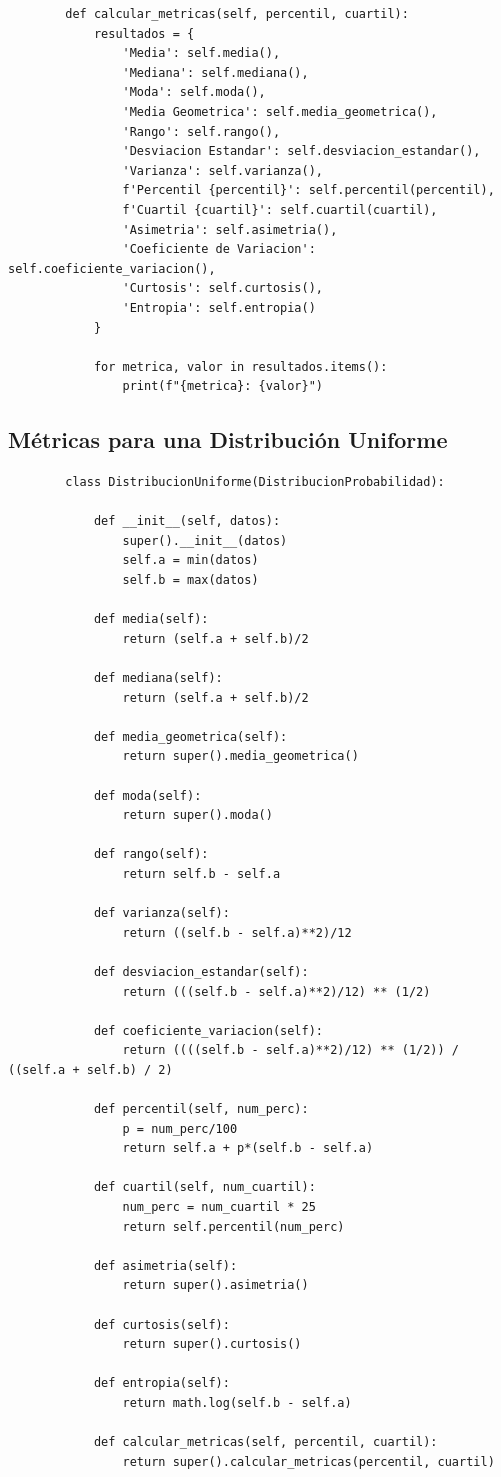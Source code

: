 \documentclass[11pt]{article} %
\begin{document}
\begin{lstlisting}
	 	def calcular_metricas(self, percentil, cuartil):
		 	resultados = {
		 		'Media': self.media(),
		 		'Mediana': self.mediana(),
		 		'Moda': self.moda(),
		 		'Media Geometrica': self.media_geometrica(),
		 		'Rango': self.rango(),
		 		'Desviacion Estandar': self.desviacion_estandar(),
		 		'Varianza': self.varianza(),
		 		f'Percentil {percentil}': self.percentil(percentil),
		 		f'Cuartil {cuartil}': self.cuartil(cuartil),
		 		'Asimetria': self.asimetria(),
		 		'Coeficiente de Variacion': self.coeficiente_variacion(),
		 		'Curtosis': self.curtosis(),
		 		'Entropia': self.entropia()
		 	}
		 	
		 	for metrica, valor in resultados.items():
			 	print(f"{metrica}: {valor}")
	 \end{lstlisting}
	
	\subsection{Métricas para una Distribución Uniforme}
	\begin{lstlisting}
		class DistribucionUniforme(DistribucionProbabilidad):
		
			def __init__(self, datos):
				super().__init__(datos)
				self.a = min(datos)
				self.b = max(datos)
			
			def media(self):
				return (self.a + self.b)/2
			
			def mediana(self):
				return (self.a + self.b)/2
			
			def media_geometrica(self):
				return super().media_geometrica()
			
			def moda(self):
				return super().moda()
			
			def rango(self):
				return self.b - self.a
			
			def varianza(self):
				return ((self.b - self.a)**2)/12
			
			def desviacion_estandar(self):
				return (((self.b - self.a)**2)/12) ** (1/2)
			
			def coeficiente_variacion(self):
				return ((((self.b - self.a)**2)/12) ** (1/2)) / ((self.a + self.b) / 2)
			
			def percentil(self, num_perc):
				p = num_perc/100
				return self.a + p*(self.b - self.a)
			
			def cuartil(self, num_cuartil):
				num_perc = num_cuartil * 25
				return self.percentil(num_perc)
			
			def asimetria(self):
				return super().asimetria()
			
			def curtosis(self):
				return super().curtosis()
			
			def entropia(self):
				return math.log(self.b - self.a)
			
			def calcular_metricas(self, percentil, cuartil):
				return super().calcular_metricas(percentil, cuartil)
		
	\end{lstlisting}
	
\end{document}
